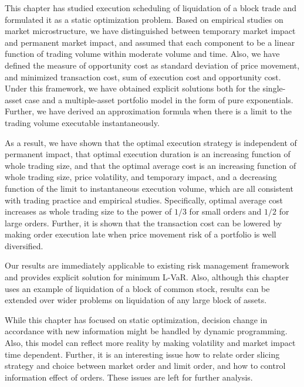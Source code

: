 This chapter has studied execution scheduling of liquidation of a block trade and formulated it as a static optimization problem.  Based on empirical studies on market microstructure, we have distinguished between temporary market impact and permanent market impact, and assumed that each component to be a linear function of trading volume within moderate volume and time.  Also, we have defined the measure of opportunity cost as standard deviation of price movement, and minimized transaction cost, sum of execution cost and opportunity cost.  Under this framework, we have obtained explicit solutions both for the single-asset case and a multiple-asset portfolio model in the form of pure exponentials.  Further, we have derived an approximation formula when there is a limit to the trading volume
executable instantaneously.  

As a result, we have shown that the optimal execution strategy is independent of permanent impact, that optimal execution duration is an increasing function of whole trading size, and that the optimal average cost is an increasing function of whole trading size, price volatility, and temporary impact, and a decreasing function of the limit to instantaneous execution volume, which are all consistent with trading practice and empirical studies.  Specifically, optimal average cost increases as whole trading size to the power of $1/3$ for small orders and $1/2$ for large orders.  Further, it is shown that the transaction cost can be lowered by making order execution late when price movement risk of a portfolio is well diversified.

Our results are immediately applicable to existing risk management framework and provides explicit solution for minimum L-VaR.  Also, although this chapter uses an example of liquidation of a block of common stock, results can be extended over wider problems on liquidation of any large block of assets.

 While this chapter has focused on static optimization, decision change in accordance with new information might be handled by dynamic programming.  Also, this model can reflect more reality by making volatility and market impact time dependent.  Further, it is an interesting issue how to relate order slicing strategy and choice between market order and limit order, and how to control information effect of orders.  These issues are left for further analysis.

\bigskip
\bigskip




